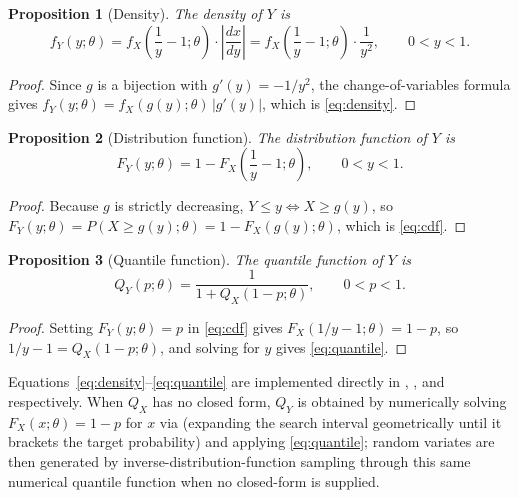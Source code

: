 \documentclass[article]{jss}
\newtheorem{proposition}{Proposition}
\begin{document}
\begin{proposition}[Density]
\label{prop:density}
The density of $Y$ is
\begin{equation}
  f_Y(y;\theta) = f_X\!\left(\frac{1}{y}-1;\theta\right)\cdot\left|\frac{dx}{dy}\right|
             = f_X\!\left(\frac{1}{y}-1;\theta\right)\cdot\frac{1}{y^2},
  \qquad 0<y<1.
  \label{eq:density}
\end{equation}
\end{proposition}
\begin{proof}
Since $g$ is a bijection with $g'(y) = -1/y^2$, the change-of-variables formula gives $f_Y(y;\theta) = f_X(g(y);\theta)\,|g'(y)|$, which is \eqref{eq:density}.
\end{proof}

\begin{proposition}[Distribution function]
\label{prop:cdf}
The distribution function of $Y$ is
\begin{equation}
  F_Y(y;\theta) = 1 - F_X\!\left(\frac{1}{y}-1;\theta\right), \qquad 0<y<1.
  \label{eq:cdf}
\end{equation}
\end{proposition}
\begin{proof}
Because $g$ is strictly decreasing, $Y \le y \iff X \ge g(y)$, so $F_Y(y;\theta) = P(X \ge g(y);\theta) = 1 - F_X(g(y);\theta)$, which is \eqref{eq:cdf}.
\end{proof}

\begin{proposition}[Quantile function]
\label{prop:quantile}
The quantile function of $Y$ is
\begin{equation}
  Q_Y(p;\theta) = \frac{1}{1+Q_X(1-p;\theta)}, \qquad 0<p<1.
  \label{eq:quantile}
\end{equation}
\end{proposition}
\begin{proof}
Setting $F_Y(y;\theta)=p$ in \eqref{eq:cdf} gives $F_X(1/y-1;\theta) = 1-p$, so $1/y-1 = Q_X(1-p;\theta)$, and solving for $y$ gives \eqref{eq:quantile}.
\end{proof}

Equations~\eqref{eq:density}--\eqref{eq:quantile} are implemented directly in , , and  respectively. When $Q_X$ has no closed form, $Q_Y$ is obtained by numerically solving $F_X(x;\theta) = 1-p$ for $x$ via  (expanding the search interval geometrically until it brackets the target probability) and applying \eqref{eq:quantile}; random variates are then generated by inverse-distribution-function sampling through this same numerical quantile function when no closed-form  is supplied.
\end{document}
